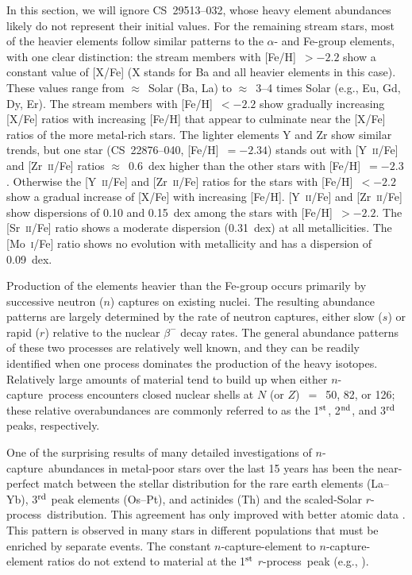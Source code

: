 \documentclass{emulateapj}
\def\rpro{\mbox{$r$-process}}
\def\ncap{\mbox{$n$-capture}}
\begin{document}
In this section, we will ignore \mbox{CS~29513--032}, whose
heavy element abundances likely do not represent their 
initial values.
For the remaining stream stars,
most of the heavier elements follow similar patterns to the 
$\alpha$- and Fe-group elements, with one clear distinction:
the stream members with [Fe/H]~$> -2.2$ show 
a constant value of [X/Fe] (X stands for Ba and all heavier elements
in this case).
These values range from $\approx$~Solar (Ba, La) to 
$\approx$~3--4 times Solar (e.g., Eu, Gd, Dy, Er).  
The stream members with [Fe/H]~$< -2.2$ show gradually increasing
[X/Fe] ratios with increasing [Fe/H] 
that appear to culminate near the [X/Fe] ratios
of the more metal-rich stars.
The lighter elements Y and Zr show similar trends, but one star
(\mbox{CS~22876--040}, [Fe/H]~$= -2.34$) stands out with 
[Y~\textsc{ii}/Fe] and [Zr~\textsc{ii}/Fe] ratios 
$\approx$~0.6~dex higher than the other stars with [Fe/H]~$= -2.3$.
Otherwise the [Y~\textsc{ii}/Fe] and [Zr~\textsc{ii}/Fe] ratios
for the stars with [Fe/H]~$< -2.2$ show a gradual increase
of [X/Fe] with increasing [Fe/H].
[Y~\textsc{ii}/Fe] and [Zr~\textsc{ii}/Fe] show dispersions
of 0.10 and 0.15~dex among the stars with [Fe/H]~$> -2.2$.
The [Sr~\textsc{ii}/Fe] ratio shows a moderate
dispersion (0.31~dex) at all metallicities.
The [Mo~\textsc{i}/Fe] ratio shows no evolution with metallicity
and has a dispersion of 0.09~dex.

Production of the elements heavier than the Fe-group occurs primarily
by successive neutron ($n$) captures on existing nuclei.
The resulting abundance patterns are largely determined by the
rate of neutron captures, either slow ($s$) or rapid ($r$)
relative to the nuclear $\beta^{-}$ decay rates.
The general abundance patterns of these two processes are 
relatively well known, and they can be readily identified 
when one process dominates the production of the heavy isotopes.
Relatively large amounts of material tend to build up when 
either \ncap\ process encounters closed nuclear shells
at $N$ (or $Z$)~$=$~50, 82, or 126;
these relative overabundances are commonly referred to as the
1$^{\rm st}$, 2$^{\rm nd}$, and 3$^{\rm rd}$ peaks, respectively.

One of the surprising results of many detailed investigations
of \ncap\ abundances in metal-poor stars over the last 15 years has 
been the near-perfect match between the 
stellar distribution for the rare earth elements (La--Yb),
3$^{\rm rd}$ peak elements (Os--Pt), and actinides (Th)
and the scaled-Solar \rpro\ distribution.
This agreement has only improved with better atomic data
\citep{sneden09}.
This pattern is observed in many stars in different
populations that must be enriched by separate events.
The constant $n$-capture-element to $n$-capture-element ratios
do not extend to material at the 1$^{\rm st}$ \rpro\ peak
(e.g., \citealt{truran02}).
\end{document}
